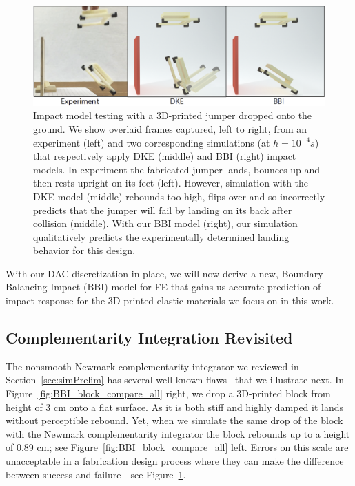 \begin{figure}[h!]
	\centering
	\includegraphics[width=0.8\columnwidth]{images/BBI_jumper_drop.png}
	\caption{Impact model testing with a 3D-printed jumper dropped onto the ground. We show overlaid frames captured, left to right, from an experiment (left) and two corresponding simulations (at $h=10^{-4}s$) that respectively apply DKE (middle) and BBI (right) impact models. In experiment the fabricated jumper lands, bounces up and then rests upright on its feet (left). However, simulation with the DKE model (middle) rebounds too high, flips over and so incorrectly predicts that the jumper will fail by landing on its back after collision (middle). With our BBI model (right), our simulation qualitatively predicts the experimentally determined landing behavior for this design.}
	\label{fig:collision_exp}
\end{figure}

With our DAC discretization in place, we will now derive a new, Boundary-Balancing Impact (BBI) model for FE that gains us accurate prediction of impact-response for the 3D-printed elastic materials we focus on in this work.

\subsection{Complementarity Integration Revisited} 
The nonsmooth Newmark complementarity integrator we reviewed in Section~\ref{sec:simPrelim} has several well-known flaws~\cite{Deuflhard:2008fu} that we illustrate next. In Figure~\ref{fig:BBI_block_compare_all} right, we drop a 3D-printed block from height of 3 cm onto a flat surface. As it is both stiff and highly damped it lands without perceptible rebound. Yet, when we simulate the same drop of the block with the Newmark complementarity integrator the block rebounds up to a height of 0.89 cm; see Figure~\ref{fig:BBI_block_compare_all} left. Errors on this scale are unacceptable in a fabrication design process where they can make the difference between success and failure - see Figure~\ref{fig:collision_exp}.

